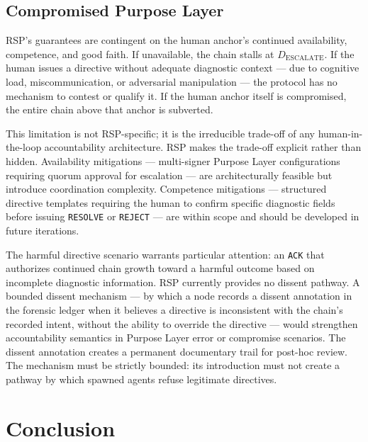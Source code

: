 \subsection{Compromised Purpose Layer}
\label{sec:rs-purpose-compromise}

RSP's guarantees are contingent on the human anchor's continued availability, competence, and good faith. If unavailable, the chain stalls at $D_{\text{ESCALATE}}$. If the human issues a directive without adequate diagnostic context — due to cognitive load, miscommunication, or adversarial manipulation — the protocol has no mechanism to contest or qualify it. If the human anchor itself is compromised, the entire chain above that anchor is subverted.

This limitation is not RSP-specific; it is the irreducible trade-off of any human-in-the-loop accountability architecture. RSP makes the trade-off explicit rather than hidden. Availability mitigations — multi-signer Purpose Layer configurations requiring quorum approval for escalation — are architecturally feasible but introduce coordination complexity. Competence mitigations — structured directive templates requiring the human to confirm specific diagnostic fields before issuing \texttt{RESOLVE} or \texttt{REJECT} — are within scope and should be developed in future iterations.

The harmful directive scenario warrants particular attention: an \texttt{ACK} that authorizes continued chain growth toward a harmful outcome based on incomplete diagnostic information. RSP currently provides no dissent pathway. A bounded dissent mechanism — by which a node records a dissent annotation in the forensic ledger when it believes a directive is inconsistent with the chain's recorded intent, without the ability to override the directive — would strengthen accountability semantics in Purpose Layer error or compromise scenarios. The dissent annotation creates a permanent documentary trail for post-hoc review. The mechanism must be strictly bounded: its introduction must not create a pathway by which spawned agents refuse legitimate directives.

\section{Conclusion}
\label{sec:rs-conclusion}

